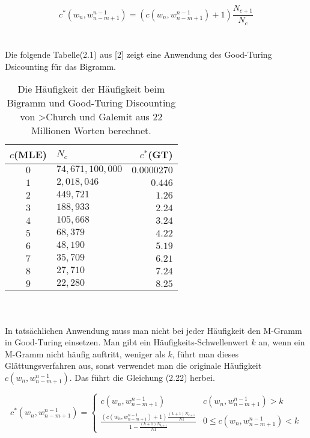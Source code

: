 \begin{equation}
c^{*}(w_{n},w_{n-m+1}^{n-1})=(c(w_{n},w_{n-m+1}^{n-1})+1)\frac{N_{c+1}}{N_{c}}
\end{equation}
\\
\\
Die folgende Tabelle(2.1)  aus [2] zeigt eine Anwendung des Good-Turing Dsicounting f\"ur das Bigramm.
\begin{table}[h]
  \begin{center}
    \begin{tabular}{clr}
      \toprule
      \bf $c$(MLE) & \bf $N_{c}$ & \bf $c^{*}$(GT)\\      
      \midrule
      $0$ &  $74,671,100,000$ & $0.0000270$  \\
      $1$ &  $2,018,046$ 			& $0.446$  \\
      $2$ &  $449,721$ 				& $1.26$  \\
      $3$ &  $188,933$ 				& $2.24$  \\
      $4$ &  $105,668$ 				& $3.24$  \\
      $5$ &  $68,379$ 				& $4.22$  \\
      $6$ &  $48,190$ 				& $5.19$  \\
      $7$ &  $35,709$ 				& $6.21$  \\
      $8$ &  $27,710$ 				& $7.24$  \\
      $9$ &  $22,280$ 				& $8.25$  \\
      \bottomrule
    \end{tabular}
  \end{center}
\caption{Die H\"aufigkeit der H\"aufigkeit beim Bigramm und Good-Turing Discounting von >Church und Galemit aus 22 Millionen Worten berechnet.}
\label{tab:table_1}
\end{table}
\\
\\
In tats\"achlichen Anwendung muss man nicht bei jeder H\"aufigkeit den M-Gramm in Good-Turing einsetzen. Man gibt ein H\"aufigkeits-Schwellenwert $k$ an, wenn ein M-Gramm nicht h\"aufig auftritt, weniger als $k$, f\"uhrt man dieses Gl\"attungsverfahren aus, sonst verwendet man die originale H\"aufigkeit $c(w_{n},w_{n-m+1}^{n-1})$. Das f\"uhrt die Gleichung (2.22) herbei.

\begin{equation}
\label{equationo:witten_bell_04}
c^{*}(w_{n},w_{n-m+1}^{n-1})=\begin{cases}
c(w_{n},w_{n-m+1}^{n-1}) & c(w_{n},w_{n-m+1}^{n-1})>k \\
\frac{(c(w_{n},w_{n-m+1}^{n-1})+1)\frac{(k+1)N_{k+1}}{N{1}}}{1-\frac{(k+1)N_{k+1}}{N{1}}} & 0 \leq c(w_{n},w_{n-m+1}^{n-1})<k 
\end{cases}
\end{equation}